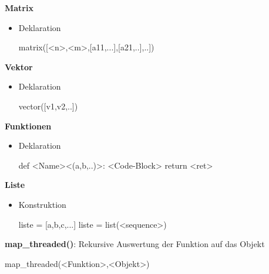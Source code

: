 \documentclass[a4paper,9pt,DIV15,twocolumn]{scrartcl}
\begin{document}
\textbf{Matrix}
\begin{itemize}
\item Deklaration
\begin{sagein}
matrix([<n>,<m>,[a11,...],[a21,..],..])
\end{sagein}
\end{itemize}

\textbf{Vektor}
\begin{itemize}
 \item Deklaration
\begin{sagein}
vector([v1,v2,..]) 
\end{sagein}
\end{itemize}

\textbf{Funktionen}
\begin{itemize}
 \item Deklaration
\begin{sagein}
def <Name><(a,b,..)>:
    <Code-Block>
    return <ret>
\end{sagein}
\end{itemize}

\textbf{Liste}
\begin{itemize}
 \item Konstruktion
\begin{sagein}
liste = [a,b,c,...] 
liste = list(<sequence>)
\end{sagein}
\end{itemize}

\textbf{map\_threaded()}:
Rekursive Auswertung der Funktion auf das Objekt
\begin{sagein}
 map_threaded(<Funktion>,<Objekt>)
\end{sagein}
\end{document}
